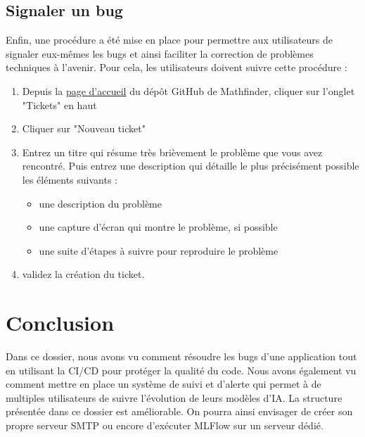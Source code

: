 \documentclass[french]{article}
\begin{document}
    \subsection{Signaler un bug}
    Enfin, une procédure a été mise en place pour permettre aux utilisateurs de signaler eux-mêmes les bugs et ainsi faciliter la correction de problèmes techniques à l'avenir. Pour cela, les utilisateurs doivent suivre cette procédure :
    \begin{enumerate}
        \item Depuis la \href{https://github.com/vinpap/mathfinder}{page d'accueil} du dépôt GitHub de Mathfinder, cliquer sur l'onglet "Tickets" en haut
        \item Cliquer sur "Nouveau ticket"
        \item Entrez un titre qui résume très brièvement le problème que vous avez rencontré. Puis entrez une description qui détaille le plus précisément possible les éléments suivants :
        \begin{itemize}
            \item une description du problème
            \item une capture d'écran qui montre le problème, si possible
            \item une suite d'étapes à suivre pour reproduire le problème
        \end{itemize}
        \item validez la création du ticket.
    \end{enumerate}

    \section{Conclusion}
    Dans ce dossier, nous avons vu comment résoudre les bugs d'une application tout en utilisant la CI/CD pour protéger la qualité du code. Nous avons également vu comment mettre en place un système de suivi et d'alerte qui permet à de multiples utilisateurs de suivre l'évolution de leurs modèles d'IA. La structure présentée dans ce dossier est améliorable. On pourra ainsi envisager de créer son propre serveur SMTP ou encore d'exécuter MLFlow sur un serveur dédié.
\end{document}
